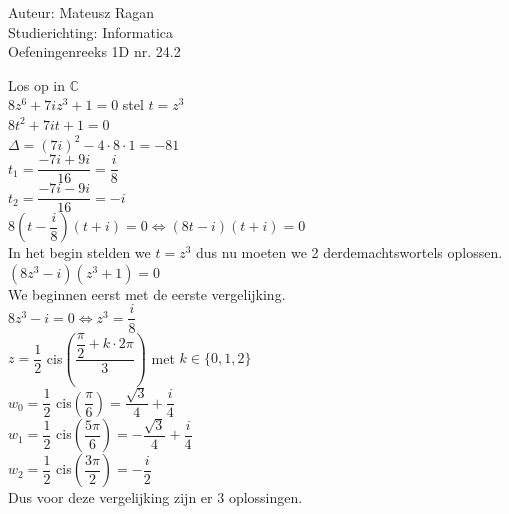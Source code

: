 \documentclass[a4paper]{article}
\begin{document}
\noindent \large Auteur: Mateusz Ragan \\
\noindent \large Studierichting: Informatica\\
\noindent \large Oefeningenreeks 1D nr. 24.2\\

\medskip

\normalsize

Los op in $\mathbb{C}$\\

$8z^6 + 7iz^3 + 1 = 0$  stel $t = z^3$\\

$8t^2 + 7it + 1 = 0$\\

$\Delta = (7i)^2 - 4\cdot 8 \cdot 1 = -81$\\

$t_1 = \dfrac{-7i + 9i}{16} = \dfrac{i}{8}$ \\

$t_2 = \dfrac{-7i - 9i}{16} = -i$\\

$8\left(t-\dfrac{i}{8}\right)(t + i) = 0 \Leftrightarrow (8t-i)(t+i) = 0$\\

In het begin stelden we $t = z^3$ dus nu moeten we 2 derdemachtswortels oplossen. \\

$(8z^3 - i)(z^3 + 1) = 0$\\

We beginnen eerst met de eerste vergelijking.\\

$8z^3 - i = 0 \Leftrightarrow z^3 = \dfrac{i}{8}$\\

$z = \dfrac{1}{2}$ cis$\left(\dfrac{\dfrac{\pi}{2}+k\cdot 2\pi}{3}\right)$ met $k \in \{0,1,2\}$\\

$w_0 = \dfrac{1}{2}$ cis$\left(\dfrac{\pi}{6}\right) = \dfrac{\sqrt{3}}{4} + \dfrac{i}{4}$ \\

$w_1 = \dfrac{1}{2}$ cis$\left(\dfrac{5\pi}{6}\right) = - \dfrac{\sqrt{3}}{4} + \dfrac{i}{4}$ \\

$w_2 = \dfrac{1}{2}$ cis$\left(\dfrac{3\pi}{2}\right) = - \dfrac{i}{2}$ \\

Dus voor deze vergelijking zijn er 3 oplossingen.\\
\end{document}
